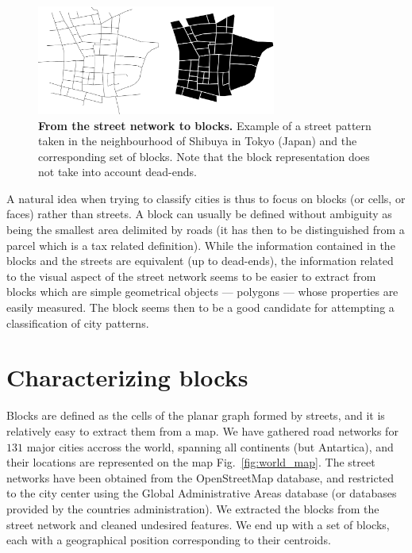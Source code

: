 \begin{figure}
    \centering
    \includegraphics[width=0.7\textwidth]{./gfx/chapter-networks/example.pdf}
    \caption{{\bf From the street network to blocks.} Example of a street pattern
    taken in the neighbourhood of Shibuya in Tokyo (Japan) and the corresponding set
    of blocks. Note that the block representation does not take into account
    dead-ends.  \label{fig:example}} 
\end{figure}

A natural idea when trying to classify cities is thus to focus on blocks (or
cells, or faces) rather than streets. A block can usually be defined without
ambiguity as being the smallest area delimited by roads (it has then to be
distinguished from a parcel which is a tax related definition). While the
information contained in the blocks and the streets are equivalent (up to
dead-ends), the information related to the visual aspect of the street network
seems to be easier to extract from blocks which are simple geometrical objects
--- polygons --- whose properties are easily measured. The block seems then to
be a good candidate for attempting a classification of city patterns. 


\section{Characterizing blocks}

Blocks are defined as the cells of the planar graph formed by streets, and it is
relatively easy to extract them from a map. We have gathered road networks for
$131$ major cities accross the world, spanning all continents (but Antartica),
and their locations are represented on the map Fig.~\ref{fig:world_map}. The
street networks have been obtained from the OpenStreetMap database,
and restricted to the city center using the Global Administrative Areas database
(or databases provided by the countries administration). We extracted the blocks
from the street network and cleaned undesired features. We end up with a set of
blocks, each with a geographical position corresponding to their centroids. 

